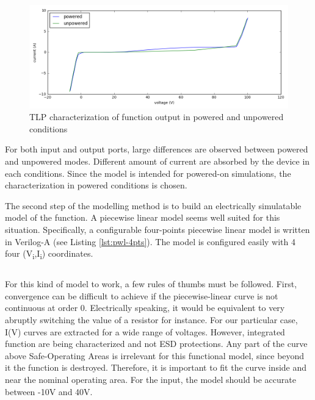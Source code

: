 \begin{figure}[!h]
  \centering
  \includegraphics[width=\textwidth]{src/4/figures/tlp_output_characterization.png}
  \caption{TLP characterization of function output in powered and unpowered conditions}
  \label{fig:tlp-output-cz}
\end{figure}

For both input and output ports, large differences are observed between powered and unpowered modes.
Different amount of current are absorbed by the device in each conditions.
Since the model is intended for powered-on simulations, the characterization in powered conditions is chosen.

The second step of the modelling method is to build an electrically simulatable model of the function.
A piecewise linear model seems well suited for this situation.
Specifically, a configurable four-points piecewise linear model is written in Verilog-A (see Listing \ref{lst:pwl-4pts}).
The model is configured easily with 4 four (V\textsubscript{i},I\textsubscript{i}) coordinates.

\begin{code}
\inputminted[frame=single]{verilog}{src/4/snippets/pwl_4pts.va}
\label{lst:pwl-4pts}
\caption{Piecewise linear 4-points Verilog-A model}
\end{code}


For this kind of model to work, a few rules of thumbs must be followed.
First, convergence can be difficult to achieve if the piecewise-linear curve is not continuous at order 0.
Electrically speaking, it would be equivalent to very abruptly switching the value of a resistor for instance.
For our particular case, I(V) curves are extracted for a wide range of voltages.
However, integrated function are being characterized and not ESD protections.
Any part of the curve above Safe-Operating Areas is irrelevant for this functional model, since beyond it the function is destroyed.
Therefore, it is important to fit the curve inside and near the nominal operating area.
For the input, the model should be accurate between -10V and 40V.

